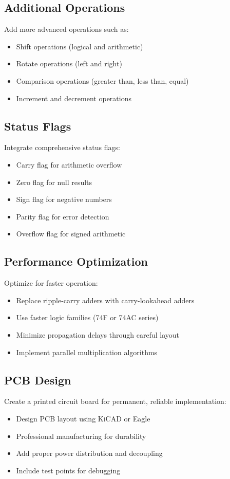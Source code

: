 \subsection{Additional Operations}
Add more advanced operations such as:
\begin{itemize}
    \item Shift operations (logical and arithmetic)
    \item Rotate operations (left and right)
    \item Comparison operations (greater than, less than, equal)
    \item Increment and decrement operations
\end{itemize}

\subsection{Status Flags}
Integrate comprehensive status flags:
\begin{itemize}
    \item Carry flag for arithmetic overflow
    \item Zero flag for null results
    \item Sign flag for negative numbers
    \item Parity flag for error detection
    \item Overflow flag for signed arithmetic
\end{itemize}

\subsection{Performance Optimization}
Optimize for faster operation:
\begin{itemize}
    \item Replace ripple-carry adders with carry-lookahead adders
    \item Use faster logic families (74F or 74AC series)
    \item Minimize propagation delays through careful layout
    \item Implement parallel multiplication algorithms
\end{itemize}

\subsection{PCB Design}
Create a printed circuit board for permanent, reliable implementation:
\begin{itemize}
    \item Design PCB layout using KiCAD or Eagle
    \item Professional manufacturing for durability
    \item Add proper power distribution and decoupling
    \item Include test points for debugging
\end{itemize}

